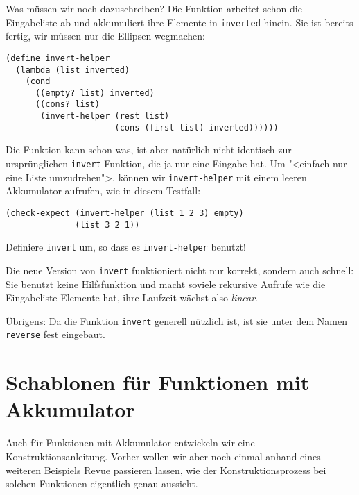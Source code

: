 %
Was müssen wir noch dazuschreiben?  Die Funktion arbeitet schon die
Eingabeliste ab und akkumuliert ihre Elemente in \lstinline{inverted}
hinein. Sie ist bereits fertig, wir müssen nur die Ellipsen wegmachen:\label{function:invert-helper}
%
\begin{lstlisting}
(define invert-helper
  (lambda (list inverted)
    (cond
      ((empty? list) inverted)
      ((cons? list)
       (invert-helper (rest list)
                      (cons (first list) inverted))))))
\end{lstlisting}
%
Die Funktion kann schon was, ist aber natürlich nicht identisch zur
ursprünglichen \lstinline{invert}-Funktion, die ja nur eine Eingabe
hat.  Um "<einfach nur eine Liste umzudrehen">, können wir
\lstinline{invert-helper} mit einem leeren Akkumulator aufrufen, wie
in diesem Testfall:
%
\begin{lstlisting}
(check-expect (invert-helper (list 1 2 3) empty)
              (list 3 2 1))
\end{lstlisting}
%
\begin{aufgabeinline}
  Definiere \lstinline{invert} um, so dass es
  \lstinline{invert-helper} benutzt!
\end{aufgabeinline}
%
Die neue Version von \lstinline{invert} funktioniert nicht nur
korrekt, sondern auch schnell: Sie benutzt keine Hilfsfunktion und
macht soviele rekursive Aufrufe wie die Eingabeliste Elemente hat, ihre
Laufzeit wächst also \textit{linear}.

Übrigens: Da die Funktion \lstinline{invert} generell nützlich ist,
ist sie unter dem Namen
\lstinline{reverse} fest eingebaut.

\section{Schablonen für Funktionen mit Akkumulator}

Auch für Funktionen mit Akkumulator entwickeln wir eine
Konstruktionsanleitung.  Vorher wollen wir aber noch einmal
anhand eines weiteren Beispiels Revue passieren lassen, wie der
Konstruktionsprozess bei solchen Funktionen eigentlich genau aussieht.

